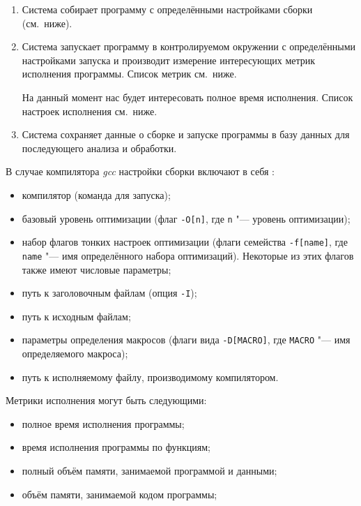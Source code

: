 \begin{enumerate}
	\item Система собирает программу с определёнными настройками сборки (см.~ниже).

	\item Система запускает программу в контролируемом окружении с определёнными настройками запуска и производит измерение интересующих метрик исполнения программы. Список метрик см.~ниже.

	На данный момент нас будет интересовать полное время исполнения.
	Список настроек исполнения см.~ниже.

	\item Система сохраняет данные о сборке и запуске программы в базу данных для последующего анализа и обработки.
\end{enumerate}

В случае компилятора \textit{gcc} настройки сборки включают в себя \cite{gcc-options}:
\begin{itemize}
    \item компилятор (команда для запуска);
    \item базовый уровень оптимизации (флаг \texttt{-O[n]}, где \texttt{n} "--- уровень оптимизации);
    \item набор флагов тонких настроек оптимизации (флаги семейства \texttt{-f[name]}, где \texttt{name} "--- имя определённого набора оптимизаций). Некоторые из этих флагов также имеют числовые параметры;
    \item путь к заголовочным файлам (опция \texttt{-I});
    \item путь к исходным файлам;
    \item параметры определения макросов (флаги вида \texttt{-D[MACRO]}, где \texttt{MACRO} "--- имя определяемого макроса);
    \item путь к исполняемому файлу, производимому компилятором.
\end{itemize}

Метрики исполнения могут быть следующими:
\begin{itemize}
    \item полное время исполнения программы;
    \item время исполнения программы по функциям;
    \item полный объём памяти, занимаемой программой и данными;
    \item объём памяти, занимаемой кодом программы;
\end{itemize}


